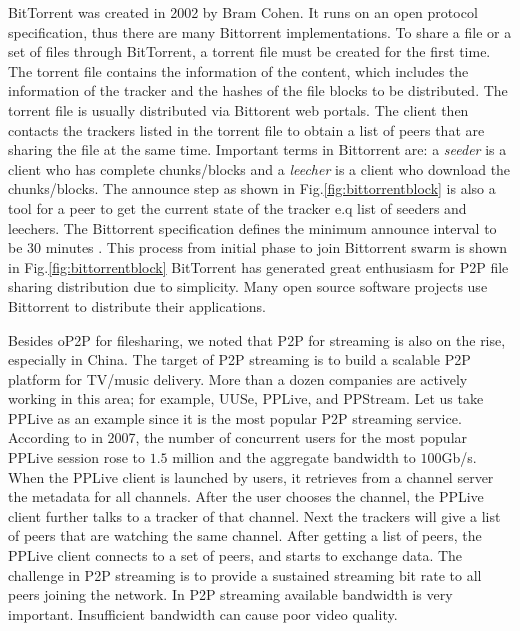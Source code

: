 BitTorrent was created in 2002 by Bram Cohen. 
It runs on an open protocol specification, thus there are many Bittorrent implementations.
To share a file or a set of files through BitTorrent, a torrent file must be created for the first time.  
The torrent file contains the information of the content, which includes the information of the tracker and the hashes of the file blocks to be distributed.
The torrent file is usually distributed via Bittorent web portals.
The client then contacts the trackers listed in the torrent file to obtain a list of peers that are sharing the file at the same time.  
Important terms in Bittorrent are: a \textit{seeder} is a client who has complete chunks/blocks and a \textit{leecher} is a client who download the chunks/blocks.
The announce step as shown in Fig.\ref{fig:bittorrentblock} is also a tool for a peer to get the current state of the tracker e.q list of seeders and leechers.
The Bittorrent specification defines the minimum announce interval to be 30 minutes \cite{torrentspec}.
This process from initial phase to join Bittorrent swarm is shown in Fig.\ref{fig:bittorrentblock}
BitTorrent has generated great enthusiasm for P2P file sharing distribution due to simplicity.  
Many open source software projects use Bittorrent to distribute their applications.

Besides oP2P for filesharing, we  noted that P2P for streaming is also on the rise, especially in China.
The target of P2P streaming is to build a scalable P2P platform for TV/music delivery. 
More than a dozen companies are actively working in this area; for example, UUSe, PPLive, and PPStream.  
Let us take PPLive as an example since it is the most popular P2P streaming service.
According to \cite{4378423} in 2007, the number of concurrent users for the most popular PPLive session rose to $1.5$ million and the aggregate bandwidth to $100$Gb/s.
When the PPLive client is launched by users, it retrieves from a channel server the metadata for  all channels. 
After the user chooses the channel, the PPLive client further talks to a tracker of that channel. 
Next the trackers will give  a list of peers that are watching the same channel. 
After getting a list of peers, the PPLive client connects to a set of peers, and starts to exchange data. 
The challenge in P2P streaming is to provide a sustained streaming bit rate to all peers joining the network. 
In P2P streaming available bandwidth is very important.  
Insufficient bandwidth can cause poor video quality.  

